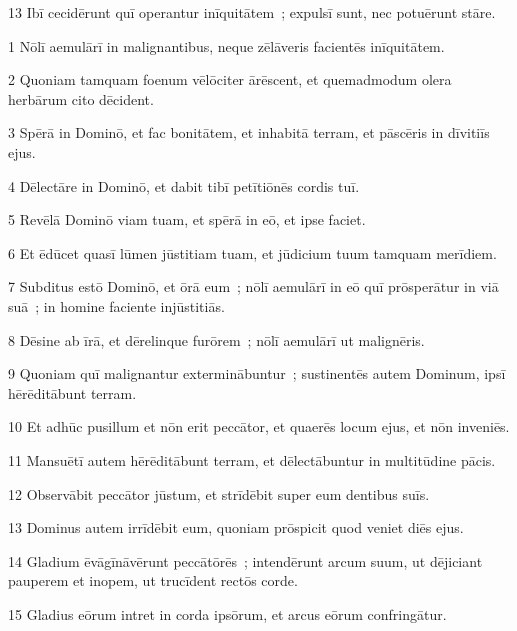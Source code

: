 \psalmVerse
  {\phantom{0}13}
  {Ibī cecidērunt quī operantur inīquitātem~; expulsī sunt, nec potuērunt stāre.}




\psalmVerse
  {\phantom{00}1}
  {Nōlī aemulārī in malignantibus, neque zēlāveris facientēs inīquitātem.}


\psalmVerse
  {\phantom{00}2}
  {Quoniam tamquam foenum vēlōciter ārēscent, et quemadmodum olera herbārum cito dēcident.}


\psalmVerse
  {\phantom{00}3}
  {Spērā in Dominō, et fac bonitātem, et inhabitā terram, et pāscēris in dīvitiīs ejus.}


\psalmVerse
  {\phantom{00}4}
  {Dēlectāre in Dominō, et dabit tibī petītiōnēs cordis tuī.}


\psalmVerse
  {\phantom{00}5}
  {Revēlā Dominō viam tuam, et spērā in eō, et ipse faciet.}


\psalmVerse
  {\phantom{00}6}
  {Et ēdūcet quasī lūmen jūstitiam tuam, et jūdicium tuum tamquam merīdiem.}


\psalmVerse
  {\phantom{00}7}
  {Subditus estō Dominō, et ōrā eum~; nōlī aemulārī in eō quī prōsperātur in viā suā~; in homine faciente injūstitiās.}


\psalmVerse
  {\phantom{00}8}
  {Dēsine ab īrā, et dērelinque furōrem~; nōlī aemulārī ut malignēris.}


\psalmVerse
  {\phantom{00}9}
  {Quoniam quī malignantur exterminābuntur~; sustinentēs autem Dominum, ipsī hērēditābunt terram.}


\psalmVerse
  {\phantom{0}10}
  {Et adhūc pusillum et nōn erit peccātor, et quaerēs locum ejus, et nōn inveniēs.}


\psalmVerse
  {\phantom{0}11}
  {Mansuētī autem hērēditābunt terram, et dēlectābuntur in multitūdine pācis.}


\psalmVerse
  {\phantom{0}12}
  {Observābit peccātor jūstum, et strīdēbit super eum dentibus suīs.}


\psalmVerse
  {\phantom{0}13}
  {Dominus autem irrīdēbit eum, quoniam prōspicit quod veniet diēs ejus.}


\psalmVerse
  {\phantom{0}14}
  {Gladium ēvāgīnāvērunt peccātōrēs~; intendērunt arcum suum, ut dējiciant pauperem et inopem, ut trucīdent rectōs corde.}


\psalmVerse
  {\phantom{0}15}
  {Gladius eōrum intret in corda ipsōrum, et arcus eōrum confringātur.}


